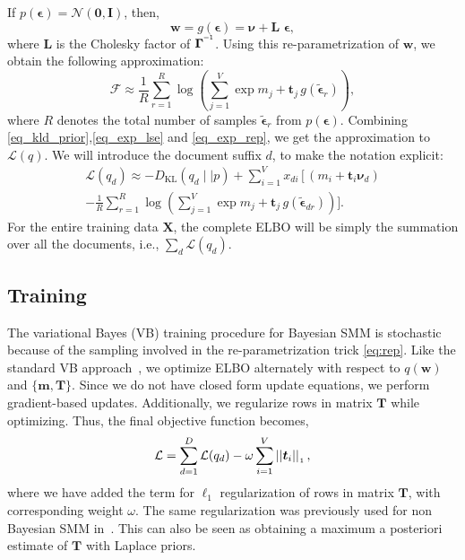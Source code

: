 \documentclass[journal]{IEEEtran}
\newcommand{\mb}[1]{\bm{#1}}
\newcommand{\bs}[1]{\bm{#1}}
\begin{document}
If \(p(\bs{\epsilon}) = \mathcal{N}(\mb{0}, \mb{I})\), then,
\begin{equation}
\label{eq:rep}
\mb{w} = g(\bs{\epsilon}) = \bs{\nu} + \mb{L} \,\, \bs{\epsilon},
\end{equation}
where \(\mb{L}\) is the Cholesky factor of \(\bs{\Gamma}^{\I}\).
Using this re-parametrization of \(\mb{w}\), we obtain the following approximation:
\begin{equation}
\label{eq_exp_rep}
\mathcal{F} \approx \frac{1}{R} \sum_{r=1}^{R} \log (\sum_{j=1}^{V} \exp{m_j + \mb{t}_j \,g(\tilde{\bs{\epsilon}}_{r})}),
\end{equation}
where \(R\) denotes the total number of samples \(\tilde{\bs{\epsilon}}_r\) 
from \(p(\bs{\epsilon})\).
Combining \eqref{eq_kld_prior},\eqref{eq_exp_lse} and \eqref{eq_exp_rep}, 
we get the approximation to \(\mathcal{L}(q)\). We will introduce the document 
suffix \(d\), to make the notation explicit:
\begin{multline}
\label{eq_complete_doc_elbo}
\mathcal{L}(q_d) \approx -D_{\mathrm{KL}}(q_d \mid\mid p) + \sum_{i=1}^{V} x_{di} \,\Big[\,(m_i + \mb{t}_i\bs{\nu}_d) \\
-\frac{1}{R} \sum_{r=1}^{R} \log (\sum_{j=1}^{V} \exp{m_j + \mb{t}_j \,g(\tilde{\bs{\epsilon}}_{dr})})\Big].
\end{multline}
For the entire training data \(\mb{X}\), the complete ELBO will be simply the summation over all the documents, i.e., \(\sum_d \mathcal{L}(q_d)\).
\subsection{Training}
\label{ssec:vb_training}
The variational Bayes (VB) training procedure for Bayesian SMM is stochastic 
because of the sampling involved in the re-parametrization trick
\eqref{eq:rep}. Like the standard VB approach~\cite{Bishop:2006:PRML}, we 
optimize ELBO alternately with respect to \(q(\mb{w})\) and \(\{\mb{m}, 
\mb{T}\}\). Since we do not have closed form update equations, we perform 
gradient-based updates. Additionally, we regularize rows in matrix \(\mb{T}\) 
while optimizing. Thus, the final objective function becomes,
\begin{equation}
\label{eq_complete_reg_elbo}
\mathcal{L} = \sum_{d=1}^{D} \mathcal{L}(q_d) - \omega \sum_{i=1}^{V} ||\mb{t}_i||_{\nr{1}}\,,
\end{equation}
where we have added the term for \(\ell_1\) regularization of rows in matrix 
\(\mb{T}\), with corresponding weight \(\omega\). The same regularization was 
previously used for non Bayesian SMM in~\cite{Kesiraju:2016:SMM}. This can also 
be seen as obtaining a maximum a posteriori estimate of \(\mb{T}\) with Laplace 
priors.
\end{document}

